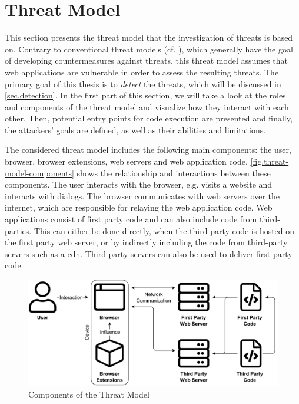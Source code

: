 \section{Threat Model}
\label{sec.threatmodel}

This section presents the threat model that the investigation of threats is based on. Contrary to conventional threat models (cf. \cite{ChromiumSecArchitecture}), which generally have the goal of developing countermeasures against threats, this threat model assumes that web applications are vulnerable in order to assess the resulting threats. The primary goal of this thesis is to \textit{detect} the threats, which will be discussed in \autoref{sec.detection}. In the first part of this section, we will take a look at the roles and components of the threat model and visualize how they interact with each other. Then, potential entry points for code execution are presented and finally, the attackers' goals are defined, as well as their abilities and limitations.

The considered threat model includes the following main components: the user, browser, browser extensions, web servers and web application code. \autoref{fig.threat-model-components} shows the relationship and interactions between these components. The user interacts with the browser, e.g. visits a website and interacts with dialogs. The browser communicates with web servers over the internet, which are responsible for relaying the web application code. Web applications consist of first party code and can also include code from third-parties. This can either be done directly, when the third-party code is hosted on the first party web server, or by indirectly including the code from third-party servers such as a \ac{cdn}. Third-party servers can also be used to deliver first party code.

\begin{figure}[H]
    \centering
    \includegraphics[width=13.9cm]{img/threat-model.pdf}
    \caption{Components of the Threat Model}
    \label{fig.threat-model-components}
\end{figure}

